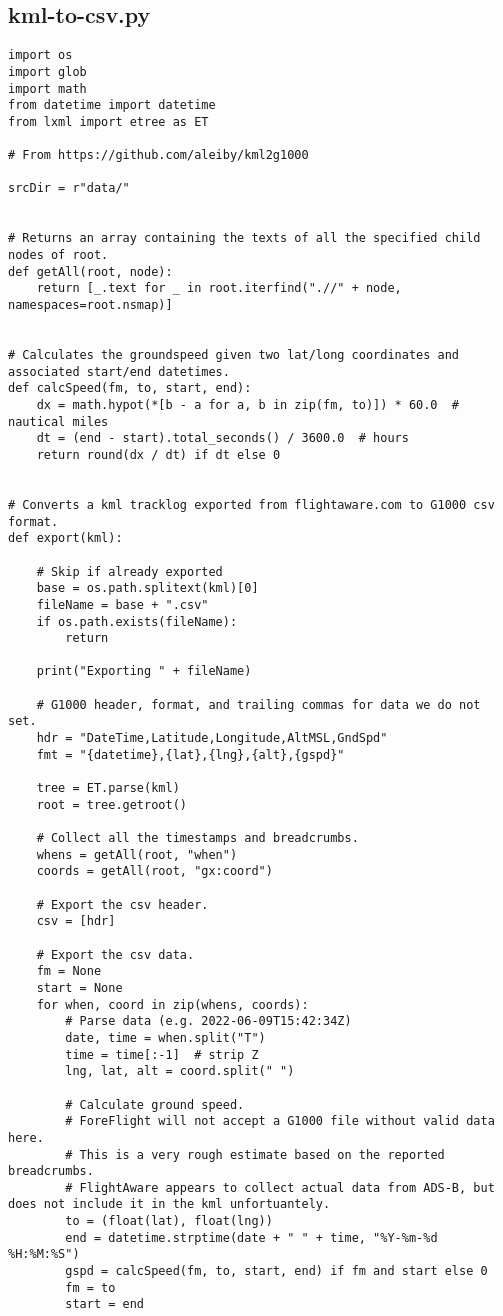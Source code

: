 \subsection{kml-to-csv.py}
\begin{verbatim}
import os
import glob
import math
from datetime import datetime
from lxml import etree as ET

# From https://github.com/aleiby/kml2g1000

srcDir = r"data/"


# Returns an array containing the texts of all the specified child nodes of root.
def getAll(root, node):
    return [_.text for _ in root.iterfind(".//" + node, namespaces=root.nsmap)]


# Calculates the groundspeed given two lat/long coordinates and associated start/end datetimes.
def calcSpeed(fm, to, start, end):
    dx = math.hypot(*[b - a for a, b in zip(fm, to)]) * 60.0  # nautical miles
    dt = (end - start).total_seconds() / 3600.0  # hours
    return round(dx / dt) if dt else 0


# Converts a kml tracklog exported from flightaware.com to G1000 csv format.
def export(kml):

    # Skip if already exported
    base = os.path.splitext(kml)[0]
    fileName = base + ".csv"
    if os.path.exists(fileName):
        return

    print("Exporting " + fileName)

    # G1000 header, format, and trailing commas for data we do not set.
    hdr = "DateTime,Latitude,Longitude,AltMSL,GndSpd"
    fmt = "{datetime},{lat},{lng},{alt},{gspd}"

    tree = ET.parse(kml)
    root = tree.getroot()

    # Collect all the timestamps and breadcrumbs.
    whens = getAll(root, "when")
    coords = getAll(root, "gx:coord")

    # Export the csv header.
    csv = [hdr]

    # Export the csv data.
    fm = None
    start = None
    for when, coord in zip(whens, coords):
        # Parse data (e.g. 2022-06-09T15:42:34Z)
        date, time = when.split("T")
        time = time[:-1]  # strip Z
        lng, lat, alt = coord.split(" ")

        # Calculate ground speed.
        # ForeFlight will not accept a G1000 file without valid data here.
        # This is a very rough estimate based on the reported breadcrumbs.
        # FlightAware appears to collect actual data from ADS-B, but does not include it in the kml unfortuantely.
        to = (float(lat), float(lng))
        end = datetime.strptime(date + " " + time, "%Y-%m-%d %H:%M:%S")
        gspd = calcSpeed(fm, to, start, end) if fm and start else 0
        fm = to
        start = end


\end{verbatim}
